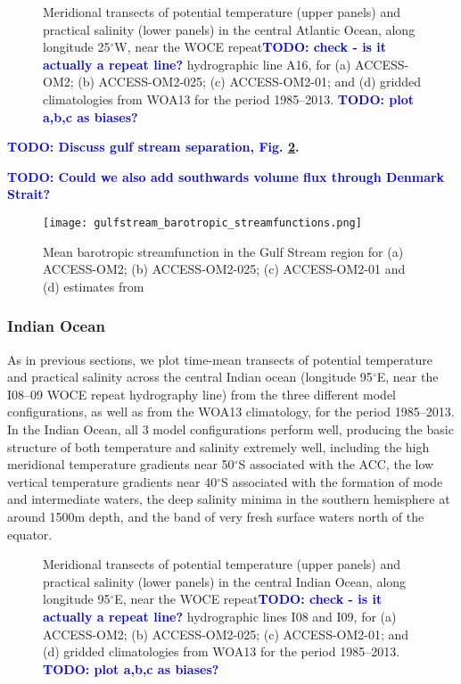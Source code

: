 \documentclass[gmd, manuscript]{copernicus}
\newcommand{\TODO}[1]{\textcolor{blue}{\textsf{\textbf{TODO: #1}}}}
\begin{document}
\begin{figure}[t]
\caption{Meridional transects of potential temperature (upper panels) and practical salinity (lower panels) in the central Atlantic Ocean, along longitude 25$^{\circ}$W, near the WOCE repeat\TODO{check - is it actually a repeat line?} hydrographic line A16, for (a)  ACCESS-OM2; (b) ACCESS-OM2-025; (c) ACCESS-OM2-01;  and (d) gridded climatologies from WOA13 for the period 1985--2013. 
\TODO{plot a,b,c as biases?}
\label{fig:Transect_Atlantic}}
\end{figure}

\TODO{Discuss gulf stream separation, Fig. \ref{fig:GulfStream_clim}.}

\TODO{Could we also add southwards volume flux through Denmark Strait?}

\begin{figure}[t]
\texttt{[image: gulfstream\_barotropic\_streamfunctions.png]}
\caption{Mean barotropic streamfunction in the Gulf Stream region for (a)  ACCESS-OM2; (b) ACCESS-OM2-025; (c) ACCESS-OM2-01 and (d) estimates from \citep{cdvo:2016} \label{fig:GulfStream_clim}}
\end{figure}


\subsubsection{Indian Ocean}

As in previous sections, we plot time-mean transects of potential temperature and practical salinity across the central Indian ocean (longitude 95$^{\circ}$E, near the I08--09 WOCE repeat hydrography line) from the three different model configurations, as well as from the WOA13 climatology, for the period 1985--2013. In the Indian Ocean, all 3 model configurations perform well, producing the basic structure of both temperature and salinity extremely well, including the high meridional temperature gradients near 50$^{\circ}$S associated with the ACC, the low vertical temperature gradients near 40$^\circ$S associated with the formation of mode and intermediate waters, the deep salinity minima in the southern hemisphere at around 1500m depth, and the band of very fresh surface waters north of the equator.  

\begin{figure}[t]
\caption{Meridional transects of potential temperature (upper panels) and practical salinity (lower panels) in the central Indian Ocean, along longitude 95$^{\circ}$E, near the WOCE repeat\TODO{check - is it actually a repeat line?} hydrographic lines I08 and I09, for (a)  ACCESS-OM2; (b) ACCESS-OM2-025; (c) ACCESS-OM2-01;  and (d) gridded climatologies from WOA13 for the period 1985--2013.
\TODO{plot a,b,c as biases?}
 \label{fig:Transect_Indian}}
\end{figure}
\end{document}
